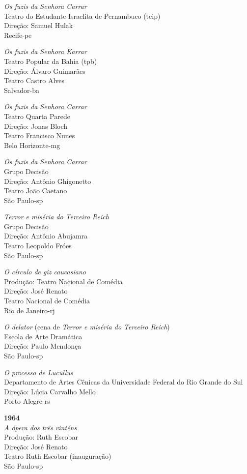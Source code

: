 {\it Os fuzis da Senhora Carrar}\\
Teatro do Estudante Israelita de Pernambuco ({\sc teip})\\
Direção: Samuel Hulak\\
Recife-{\sc pe}

{\it Os fuzis da Senhora Karrar}\\
Teatro Popular da Bahia ({\sc tpb})\\
Direção: Álvaro Guimarães\\
Teatro Castro Alves\\
Salvador-{\sc ba}

{\it Os fuzis da Senhora Carrar}\\
Teatro Quarta Parede\\
Direção: Jonas Bloch\\
Teatro Francisco Nunes\\
Belo Horizonte-{\sc mg}

{\it Os fuzis da Senhora Carrar}\\
Grupo Decisão\\
Direção: Antônio Ghigonetto\\
Teatro João Caetano\\
São Paulo-{\sc sp}

{\it Terror e miséria do Terceiro Reich}\\
Grupo Decisão\\
Direção: Antônio Abujamra\\
Teatro Leopoldo Fróes\\
São Paulo-{\sc sp}

{\it O círculo de giz caucasiano}\\
Produção: Teatro Nacional de Comédia\\
Direção: José Renato\\
Teatro Nacional de Comédia\\
Rio de Janeiro-{\sc rj}

{\it O delator} (cena de {\it Terror e miséria do Terceiro Reich})\\
Escola de Arte Dramática\\
Direção: Paulo Mendonça\\
São Paulo-{\sc sp}

{\it O processo de Lucullus}\\
Departamento de Artes Cênicas da Universidade Federal do Rio Grande do
Sul\\
Direção: Lúcia Carvalho Mello\\
Porto Alegre-{\sc rs}

\item{\bf 1964}\\
{\it A ópera dos três vinténs}\\
Produção: Ruth Escobar\\
Direção: José Renato\\
Teatro Ruth Escobar (inauguração)\\
São Paulo-{\sc sp}

